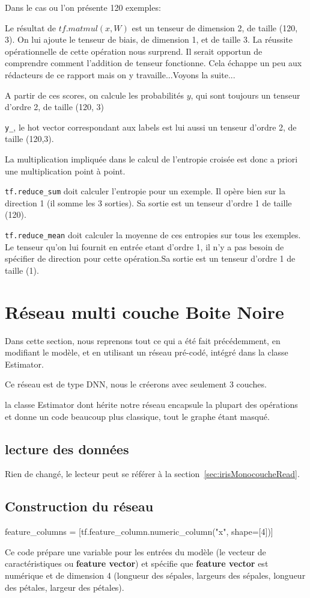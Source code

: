 \documentclass[a4paper,11pt]{book}
\begin{document}
Dans le cas ou l'on présente 120 exemples:

Le résultat de $tf.matmul(x,W)$ est un tenseur de dimension 2, de taille (120, 3).
On lui ajoute le tenseur de biais, de dimension 1, et de taille 3.
La réussite opérationnelle de cette opération nous surprend.
Il serait opportun de comprendre comment l'addition de tenseur fonctionne. Cela échappe un peu aux rédacteurs de ce rapport mais on y travaille...Voyons la suite...

A partir de ces scores, on calcule les probabilités $y$, qui sont toujours un tenseur d'ordre 2, de taille (120, 3)

\verb+y_+, le hot vector correspondant aux labels est lui aussi un tenseur d'ordre 2, de taille (120,3).

La multiplication impliquée dans le calcul de l'entropie croisée est donc a priori une multiplication point à point.

\verb+tf.reduce_sum+ doit calculer l'entropie pour un exemple. Il opère bien sur la direction 1 (il somme les 3 sorties). Sa sortie est un tenseur d'ordre 1 de taille (120).

\verb+tf.reduce_mean+ doit calculer la moyenne de ces entropies sur tous les exemples. Le tenseur qu'on lui fournit en entrée etant d'ordre 1, il n'y a pas besoin de spécifier de direction pour cette opération.Sa sortie est un tenseur d'ordre 1 de taille (1).


\section{ Réseau multi couche Boite Noire }
Dans cette section, nous reprenons tout ce qui a été fait précédemment, en modifiant le modèle, et en utilisant un réseau pré-codé, intégré dans la classe Estimator.

Ce réseau est de type DNN, nous le créerons avec seulement 3 couches.

la classe Estimator dont hérite notre réseau encapsule la plupart des opérations et donne un code beaucoup plus classique, tout le graphe étant masqué. 

\subsection{lecture des données}
Rien de changé, le lecteur peut se référer à la
section~\ref{sec:irisMonocoucheRead}.

\subsection{Construction du réseau}
\label{sec:irisMulticoucheBuild}
\begin{mypython}
feature_columns = [tf.feature_column.numeric_column("x", shape=[4])]
\end{mypython}
Ce code prépare une variable pour les entrées du modèle (le vecteur de caractéristiques ou \textbf{feature vector}) et spécifie que \textbf{feature vector} est numérique et de dimension 4 (longueur des sépales, largeurs des sépales, longueur des pétales, largeur des pétales).
\end{document}
